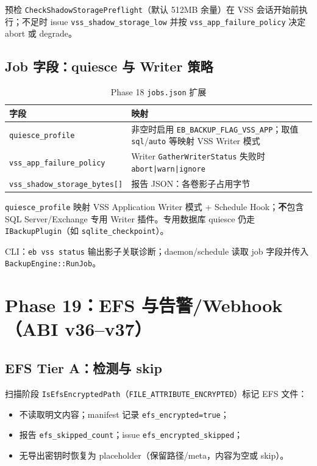 预检 \texttt{CheckShadowStoragePreflight}（默认 512MB 余量）在 VSS 会话开始前执行；不足时 issue \texttt{vss\_shadow\_storage\_low} 并按 \texttt{vss\_app\_failure\_policy} 决定 abort 或 degrade。

\subsection{Job 字段：quiesce 与 Writer 策略}

\begin{longtable}{@{}lp{9cm}@{}}
\caption{Phase 18 \texttt{jobs.json} 扩展} \\
\toprule
字段 & 映射 \\
\midrule
\texttt{quiesce\_profile} & 非空时启用 \texttt{EB\_BACKUP\_FLAG\_VSS\_APP}；取值 \texttt{sql}/\texttt{auto} 等映射 VSS Writer 模式 \\
\texttt{vss\_app\_failure\_policy} & Writer \texttt{GatherWriterStatus} 失败时 \texttt{abort|warn|ignore} \\
\texttt{vss\_shadow\_storage\_bytes[]} & 报告 JSON：各卷影子占用字节 \\
\bottomrule
\end{longtable}

\begin{designbox}
\texttt{quiesce\_profile} 映射 VSS Application Writer 模式 + Schedule Hook；\textbf{不}包含 SQL Server/Exchange 专用 Writer 插件。专用数据库 quiesce 仍走 \texttt{IBackupPlugin}（如 \texttt{sqlite\_checkpoint}）。
\end{designbox}

CLI：\texttt{eb vss status} 输出影子关联诊断；daemon/schedule 读取 job 字段并传入 \texttt{BackupEngine::RunJob}。

\section{Phase 19：EFS 与告警/Webhook（ABI v36--v37）}
\label{sec:phase19-efs}

\subsection{EFS Tier A：检测与 skip}

扫描阶段 \texttt{IsEfsEncryptedPath}（\texttt{FILE\_ATTRIBUTE\_ENCRYPTED}）标记 EFS 文件：
\begin{itemize}[nosep]
  \item 不读取明文内容；manifest 记录 \texttt{efs\_encrypted=true}；
  \item 报告 \texttt{efs\_skipped\_count}；issue \texttt{efs\_encrypted\_skipped}；
  \item 无导出密钥时恢复为 placeholder（保留路径/meta，内容为空或 skip）。
\end{itemize}

